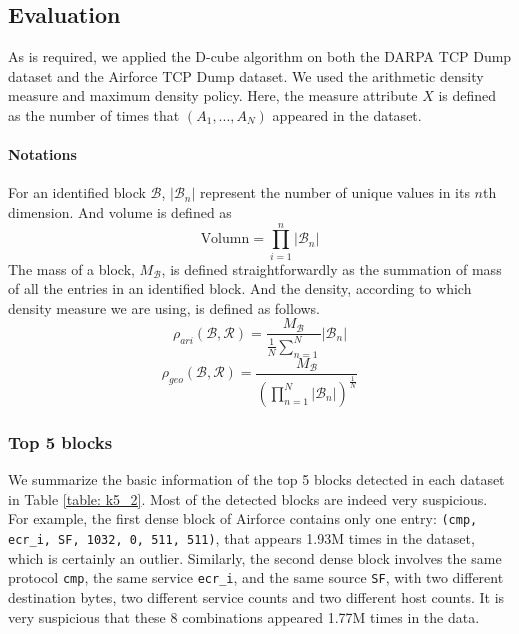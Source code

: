 \subsection{Evaluation}
As is required, we applied the D-cube algorithm on both the DARPA TCP Dump dataset and the Airforce TCP Dump dataset. We used the arithmetic density measure and maximum density policy. Here, the measure attribute $X$ is defined as the number of times that $(A_1, ..., A_N)$ appeared in the dataset. 

\paragraph{Notations} For an identified block $\mathcal{B}$, $|\mathcal{B}_n|$ represent the number of unique values in its $n$th dimension. And volume is defined as
$$\text{Volumn} = \prod\limits_{i = 1}^n |\mathcal{B}_n|$$ 
The mass of a block, $M_{\mathcal{B}}$, is defined straightforwardly as the summation of mass of all the entries in an identified block. And the density, according to which density measure we are using, is defined as follows.
$$\rho_{ari}(\mathcal{B}, \mathcal{R}) = \frac{M_{\mathcal{B}}}{\frac{1}{N}\sum_{n = 1}^N }|\mathcal{B}_n|$$
$$\rho_{geo}(\mathcal{B}, \mathcal{R}) = \frac{M_{\mathcal{B}}}{(\prod_{n = 1}^N |\mathcal{B}_n|)^{\frac{1}{N}}}$$


\subsubsection{Top 5 blocks}
We summarize the basic information of the top 5 blocks detected in each dataset in Table \ref{table: k5_2}.
Most of the detected blocks are indeed very suspicious. For example, the first dense block of Airforce contains only one entry: {\tt (cmp, ecr\_i, SF,  1032, 0, 511, 511)}, that appears 1.93M times in the dataset, which is certainly an outlier. Similarly, the second dense block involves the same protocol {\tt cmp}, the same service {\tt ecr\_i}, and the same source {\tt SF}, with two different destination bytes, two different service counts and two different host counts. It is very suspicious that these 8 combinations appeared 1.77M times in the data.


